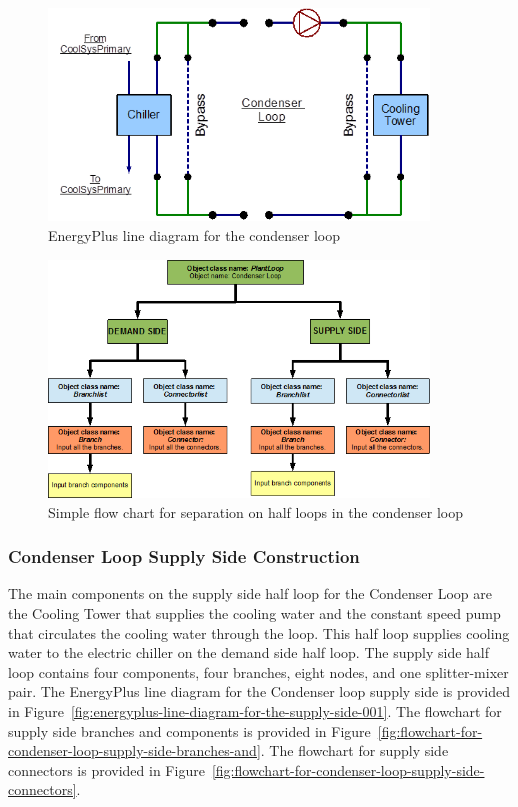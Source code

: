 \begin{figure}[hbtp] %
\centering
\includegraphics[width=0.9\textwidth, height=0.9\textheight, keepaspectratio=true]{media/image062.png}
\caption{EnergyPlus line diagram for the condenser loop \protect \label{fig:energyplus-line-diagram-for-the-condenser}}
\end{figure}

\begin{figure}[hbtp] %
\centering
\includegraphics[width=0.9\textwidth, height=0.9\textheight, keepaspectratio=true]{media/image063.png}
\caption{Simple flow chart for separation on half loops in the condenser loop \protect \label{fig:simple-flow-chart-for-separation-on-half}}
\end{figure}

\subsubsection{Condenser Loop Supply Side Construction}\label{condenser-loop-supply-side-construction}

The main components on the supply side half loop for the Condenser Loop are the Cooling Tower that supplies the cooling water and the constant speed pump that circulates the cooling water through the loop. This half loop supplies cooling water to the electric chiller on the demand side half loop. The supply side half loop contains four components, four branches, eight nodes, and one splitter-mixer pair. The EnergyPlus line diagram for the Condenser loop supply side is provided in Figure~\ref{fig:energyplus-line-diagram-for-the-supply-side-001}. The flowchart for supply side branches and components is provided in Figure~\ref{fig:flowchart-for-condenser-loop-supply-side-branches-and}. The flowchart for supply side connectors is provided in Figure~\ref{fig:flowchart-for-condenser-loop-supply-side-connectors}.


